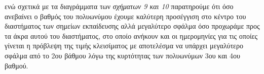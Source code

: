 \documentclass[Second Project.tex]{subfiles}
\begin{document}
ενώ σχετικά με τα διαγράμματα των \textit{σχήματων 9 και 10} παρατηρούμε ότι όσο ανεβαίνει ο βαθμός του 
πολυωνύμου έχουμε καλύτερη προσέγγιση στο κέντρο του διαστήματος των σημείων εκπαίδευσης αλλά μεγαλύτερο σφάλμα
όσο προχωράμε προς τα άκρα αυτού του διαστήματος, στο οποίο ανήκουν και οι ημερομηνίες για τις οποίες γίνεται
η πρόβλεψη της τιμής κλεισίματος με αποτελέσμα να υπάρχει μεγαλύτερο σφάλμα από το 2ου βάθμου λόγω της 
κυρτότητας των πολυωνύμων 3ου και 4ου βαθμού. 
\newpage
\end{document}
